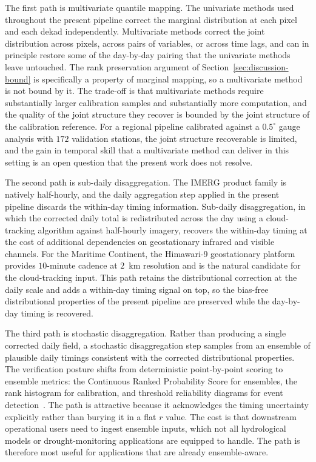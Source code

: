 The first path is multivariate quantile mapping. The univariate
methods used throughout the present pipeline correct the marginal
distribution at each pixel and each dekad independently.
Multivariate methods correct the joint distribution across pixels,
across pairs of variables, or across time lags, and can in
principle restore some of the day-by-day pairing that the
univariate methods leave untouched. The rank preservation
argument of Section~\ref{sec:discussion-bound} is specifically a
property of marginal mapping, so a multivariate method is not
bound by it. The trade-off is that multivariate methods require
substantially larger calibration samples and substantially more
computation, and the quality of the joint structure they recover
is bounded by the joint structure of the calibration reference.
For a regional pipeline calibrated against a $0.5^{\circ}$ gauge
analysis with $172$ validation stations, the joint structure
recoverable is limited, and the gain in temporal skill that a
multivariate method can deliver in this setting is an open
question that the present work does not resolve.

The second path is sub-daily disaggregation. The IMERG product
family is natively half-hourly, and the daily aggregation step
applied in the present pipeline discards the within-day timing
information. Sub-daily disaggregation, in which the corrected
daily total is redistributed across the day using a
cloud-tracking algorithm against half-hourly imagery, recovers
the within-day timing at the cost of additional dependencies on
geostationary infrared and visible channels. For the Maritime
Continent, the Himawari-9 geostationary platform~\citep{ref:bessho2016} provides
$10$-minute cadence at $2$~km resolution and is the natural
candidate for the cloud-tracking input. This path retains the
distributional correction at the daily scale and adds a
within-day timing signal on top, so the bias-free distributional
properties of the present pipeline are preserved while the
day-by-day timing is recovered.

The third path is stochastic disaggregation. Rather than
producing a single corrected daily field, a stochastic
disaggregation step samples from an ensemble of plausible daily
timings consistent with the corrected distributional properties.
The verification posture shifts from deterministic point-by-point
scoring to ensemble metrics: the Continuous Ranked Probability
Score for ensembles, the rank histogram for calibration, and
threshold reliability diagrams for event detection~\citep{ref:wilks2020}. The path is
attractive because it acknowledges the timing uncertainty
explicitly rather than burying it in a flat $r$ value. The cost
is that downstream operational users need to ingest ensemble
inputs, which not all hydrological models or drought-monitoring
applications are equipped to handle. The path is therefore most
useful for applications that are already ensemble-aware.


